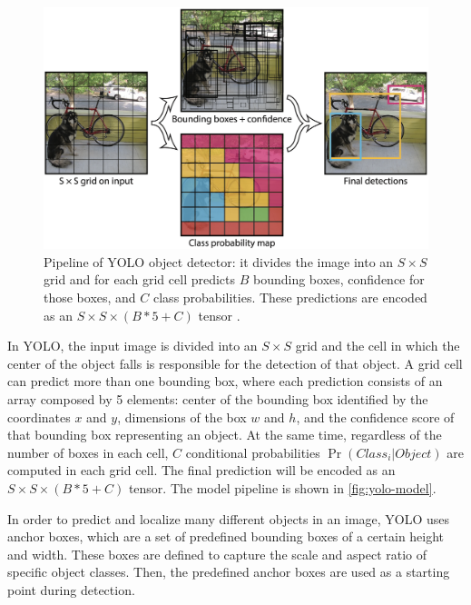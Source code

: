 \begin{figure}
    \begin{center}
        \includegraphics[width=\columnwidth]{images/yolo-model.png}
    \end{center}
    \caption{Pipeline of YOLO object detector: it divides the image into an $S \times S$ grid and for each grid cell predicts $B$ bounding boxes, confidence for those boxes, and $C$ class probabilities. These predictions are encoded as an $S \times S \times (B * 5 + C)$ tensor \cite{redmon2016you}.}
    \label{fig:yolo-model}
\end{figure}

In YOLO, the input image is divided into an $S \times S$ grid and the cell in which the center of the object falls is responsible for the detection of that object.
A grid cell can predict more than one bounding box, where each prediction consists of an array composed by 5 elements: center of the bounding box identified by the coordinates $x$ and $y$, dimensions of the box $w$ and $h$, and the confidence score of that bounding box representing an object. At the same time, regardless of the number of boxes in each cell, $C$ conditional probabilities $\Pr(Class_i | Object)$ are computed in each grid cell. The final prediction will be encoded as an $S \times S \times (B * 5 + C)$ tensor. The model pipeline is shown in \autoref{fig:yolo-model}.

In order to predict and localize many different objects in an image, YOLO uses anchor boxes, which are a set of predefined bounding boxes of a certain height and width. These boxes are defined to capture the scale and aspect ratio of specific object classes. Then, the predefined anchor boxes are used as a starting point during detection.

